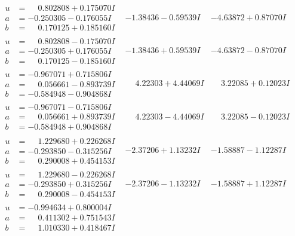 \documentclass[1p]{elsarticle_modified}
\theoremstyle{definition}
\begin{document}
$$\begin{array}{c|c|c}
\begin{aligned}
u &= \phantom{-}0.802808 + 0.175070 I \\
a &= -0.250305 - 0.176055 I \\
b &= \phantom{-}0.170125 + 0.185160 I\end{aligned}
 & -1.38436 - 0.59539 I & -4.63872 + 0.87070 I \\ \hline\begin{aligned}
u &= \phantom{-}0.802808 - 0.175070 I \\
a &= -0.250305 + 0.176055 I \\
b &= \phantom{-}0.170125 - 0.185160 I\end{aligned}
 & -1.38436 + 0.59539 I & -4.63872 - 0.87070 I \\ \hline\begin{aligned}
u &= -0.967071 + 0.715806 I \\
a &= \phantom{-}0.056661 - 0.893739 I \\
b &= -0.584948 - 0.904868 I\end{aligned}
 & \phantom{-}4.22303 + 4.44069 I & \phantom{-}3.22085 + 0.12023 I \\ \hline\begin{aligned}
u &= -0.967071 - 0.715806 I \\
a &= \phantom{-}0.056661 + 0.893739 I \\
b &= -0.584948 + 0.904868 I\end{aligned}
 & \phantom{-}4.22303 - 4.44069 I & \phantom{-}3.22085 - 0.12023 I \\ \hline\begin{aligned}
u &= \phantom{-}1.229680 + 0.226268 I \\
a &= -0.293850 - 0.315256 I \\
b &= \phantom{-}0.290008 + 0.454153 I\end{aligned}
 & -2.37206 + 1.13232 I & -1.58887 - 1.12287 I \\ \hline\begin{aligned}
u &= \phantom{-}1.229680 - 0.226268 I \\
a &= -0.293850 + 0.315256 I \\
b &= \phantom{-}0.290008 - 0.454153 I\end{aligned}
 & -2.37206 - 1.13232 I & -1.58887 + 1.12287 I \\ \hline\begin{aligned}
u &= -0.994634 + 0.800004 I \\
a &= \phantom{-}0.411302 + 0.751543 I \\
b &= \phantom{-}1.010330 + 0.418467 I\end{aligned}

\end{array}$$
\end{document}
